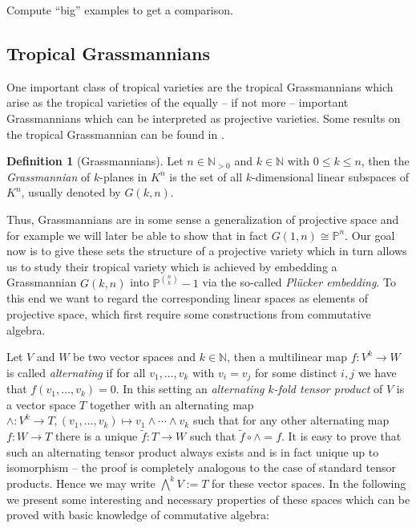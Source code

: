 \documentclass[
  paper=a4,
  titlepage,
  bibliography=totoc,
  listof=totoc,
  pagesize=pdftex
]{scrartcl}
\numberwithin{figure}{section}
\numberwithin{equation}{section}
\numberwithin{table}{section}
\newcommand*\setN{\mathds{N}}
\newcommand*\setP{\mathds{P}}
\theoremstyle{definition}
\newtheorem{definition}{Definition}
\numberwithin{definition}{section}
\begin{document}
Compute \enquote{big} examples to get a comparison.

\subsection{Tropical Grassmannians}

One important class of tropical varieties are the tropical Grassmannians which arise as
the tropical varieties of the equally -- if not more -- important Grassmannians which can
be interpreted as projective varieties. Some results on the tropical Grassmannian can be
found in \cite{tropGrass}.

\begin{definition}[Grassmannians]
  Let $n \in \setN_{>0}$ and $k \in \setN$ with $0 \leq k \leq n$, then the
  \emph{Grassmannian} of $k$-planes in $K^n$ is the set of all $k$-dimensional linear
  subspaces of $K^n$, usually denoted by $G(k, n)$.
\end{definition}

Thus, Grassmannians are in some sense a generalization of projective space and for example
we will later be able to show that in fact $G(1,n) \cong \setP^n$. Our goal now is to
give these sets the structure of a projective variety which in turn allows us to study their
tropical variety which is achieved by embedding a Grassmannian $G(k, n)$ into $\setP^{\binom
nk}-1$ via the so-called \emph{Plücker embedding}. To this end we want to regard the
corresponding linear spaces as elements of projective space, which first require some
constructions from commutative algebra.

Let $V$ and $W$ be two vector spaces and $k\in\setN$, then a multilinear map $f : V^k \to
W$ is called \emph{alternating} if for all $v_1, \dots, v_k$ with $v_i=v_j$ for some
distinct $i,j$ we have that $f(v_1, \dots, v_k) = 0$. In this setting an \emph{alternating
$k$-fold tensor product} of $V$ is a vector space $T$ together with an alternating map
$\wedge:V^k\to T, (v_1, \dots, v_k) \mapsto v_1\wedge\cdots\wedge v_k$ such that for any
other alternating map $f:W\to T$ there is a unique $\tilde f:T\to W$ such that $\tilde f
\circ \wedge = f$. It is easy to prove that such an alternating tensor product always
exists and is in fact unique up to isomorphism -- the proof is completely analogous to the
case of standard tensor products. Hence we may write $\bigwedge^k V := T$ for these vector
spaces. In the following we present some interesting and necessary properties of these
spaces which can be proved with basic knowledge of commutative algebra:
\end{document}

